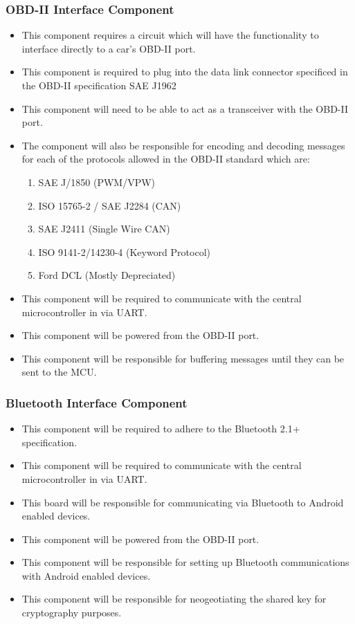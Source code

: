 \documentclass[12pt,letterpaper]{article}
\begin{document}
\subsubsection{OBD-II Interface Component}
\begin{itemize}
	\item This component requires a circuit which will have the functionality to interface directly to a car's OBD-II port. 
	\item This component is required to plug into the data link connector specificed in the OBD-II specification SAE J1962
	\item This component will need to be able to act as a transceiver with the OBD-II port.
	\item The component will also be responsible for encoding and decoding messages for each of the protocols allowed in the OBD-II standard which are:
	\begin{enumerate}
		\item SAE J/1850 (PWM/VPW)
		\item ISO 15765-2 / SAE J2284 (CAN)
		\item SAE J2411 (Single Wire CAN)
		\item ISO 9141-2/14230-4 (Keyword Protocol)
		\item Ford DCL (Mostly Depreciated) 
	\end{enumerate}
	\item This component will be required to communicate with the central microcontroller in via UART.
	\item This component will be powered from the OBD-II port.
	\item This component will be responsible for buffering messages until they can be sent to the MCU.
\end{itemize}

\subsubsection{Bluetooth Interface Component}
\begin{itemize}
	\item This component will be required to adhere to the Bluetooth 2.1+ specification.
	\item This component will be required to communicate with the central microcontroller in via UART.
	\item This board will be responsible for communicating via Bluetooth to Android enabled devices.
	\item This component will be powered from the OBD-II port.
	\item This component will be responsible for setting up Bluetooth communications with Android enabled devices.
	\item This component will be responsible for neogeotiating the shared key for cryptography purposes.
\end{itemize}
\end{document}
